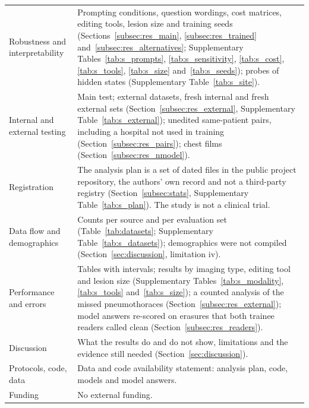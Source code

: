 \begin{table}[!htbp]
\begin{tabular}{@{}L{0.25\textwidth}L{0.71\textwidth}@{}}
Robustness and interpretability & Prompting conditions, question wordings, cost matrices, editing tools, lesion size and training seeds (Sections~\ref{subsec:res_main}, \ref{subsec:res_trained} and~\ref{subsec:res_alternatives}; Supplementary Tables~\ref{tab:s_prompts}, \ref{tab:s_sensitivity}, \ref{tab:s_cost}, \ref{tab:s_tools}, \ref{tab:s_size} and~\ref{tab:s_seeds}); probes of hidden states (Supplementary Table~\ref{tab:s_site}). \\
Internal and external testing & Main test; external datasets, fresh internal and fresh external sets (Section~\ref{subsec:res_external}, Supplementary Table~\ref{tab:s_external}); unedited same-patient pairs, including a hospital not used in training (Section~\ref{subsec:res_pairs}); chest films (Section~\ref{subsec:res_nmodel}). \\
Registration & The analysis plan is a set of dated files in the public project repository, the authors' own record and not a third-party registry (Section~\ref{subsec:stats}, Supplementary Table~\ref{tab:s_plan}). The study is not a clinical trial. \\
Data flow and demographics & Counts per source and per evaluation set (Table~\ref{tab:datasets}; Supplementary Table~\ref{tab:s_datasets}); demographics were not compiled (Section~\ref{sec:discussion}, limitation iv). \\
Performance and errors & Tables with intervals; results by imaging type, editing tool and lesion size (Supplementary Tables~\ref{tab:s_modality}, \ref{tab:s_tools} and~\ref{tab:s_size}); a counted analysis of the missed pneumothoraces (Section~\ref{subsec:res_external}); model answers re-scored on erasures that both trainee readers called clean (Section~\ref{subsec:res_readers}). \\
Discussion & What the results do and do not show, limitations and the evidence still needed (Section~\ref{sec:discussion}). \\
Protocols, code, data & Data and code availability statement: analysis plan, code, models and model answers. \\
Funding & No external funding. \\
\bottomrule
\end{tabular}
\end{table}

